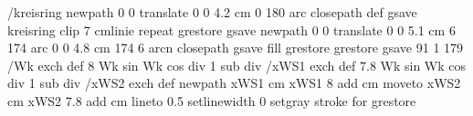 {{%
/kreisring { newpath
                      0 0 translate
                      0 0 4.2 cm 0 180 arc
                     closepath
                    } def
               gsave
                        kreisring clip
                        7 {cmlinie} repeat
              grestore
   gsave
                 newpath
                      0 0 translate
                      0 0 5.1 cm 6 174 arc
                      0 0 4.8 cm 174 6 arcn
                 closepath
                   gsave
                    \pst@usecolor\ProLineCol
        \tx@setTransparency fill 
                 grestore
   grestore
 gsave
   91 1 179 { /Wk exch def %
                       {8 Wk sin Wk cos div 1 sub div} /xWS1 exch def %
                       {7.8 Wk sin Wk cos div 1 sub div} /xWS2 exch def %
                        newpath
                        xWS1 cm xWS1 8 add cm moveto %
                        xWS2 cm xWS2 7.8 add cm %
                       lineto
                       0.5 setlinewidth
                       0 setgray
                       stroke
                   } for
  grestore
}}
